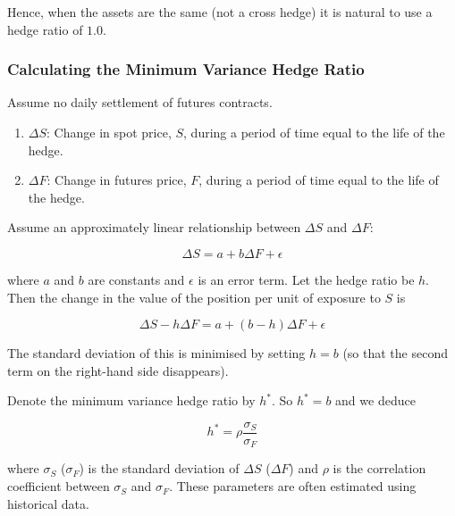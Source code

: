 Hence, when the assets are the same (not a cross hedge) it is natural to use a hedge ratio of \(1.0\).

\subsubsection*{Calculating the Minimum Variance Hedge Ratio}



\begin{definition}
    Assume no daily settlement of futures contracts.
    \begin{enumerate}
        \item[] \(\Delta S\): Change in spot price, \(S\), during a period of time equal to the life of the hedge.
        \item[] \(\Delta F\): Change in futures price, \(F\), during a period of time equal to the life of the hedge.
    \end{enumerate}
\end{definition}

Assume an approximately linear relationship between \(\Delta S\) and \(\Delta F\):

\begin{equation*}
    \Delta S = a + b \Delta F  + \epsilon
\end{equation*}

where \(a\) and \(b\) are constants and \(\epsilon\) is an error term. Let the hedge ratio be \(h\). Then the change in the value of the position per unit of exposure to \(S\) is

\begin{equation*}
    \Delta S - h \Delta F = a + (b-h) \Delta F + \epsilon
\end{equation*}

The standard deviation of this is minimised by setting \(h=b\) (so that the second term on the right-hand side disappears). 

Denote the minimum variance hedge ratio by \(h^*\). So \(h^{*} = b\) and we deduce

\begin{equation}\label{eq:2}
    h^{*} = \rho \frac{\sigma_{S}}{\sigma_{F}}
\end{equation}

where \(\sigma_{S}\) (\(\sigma_{F}\)) is the standard deviation of \(\Delta S\) (\(\Delta F\)) and \(\rho\) is the correlation coefficient between \(\sigma_{S}\) and \(\sigma_{F}\). These parameters are often estimated using historical data.

